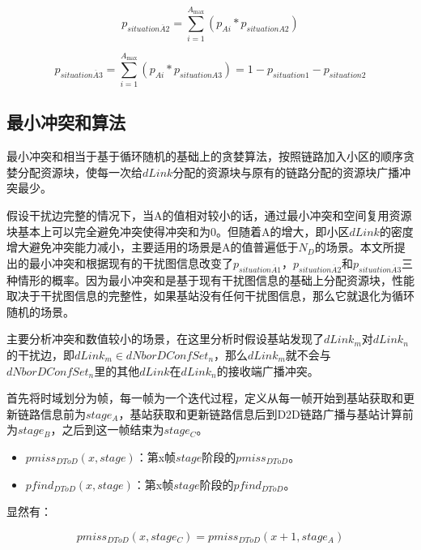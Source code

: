 \documentclass[figurelist,tablelist,algorithmlist,nomlist,masters]{seuthesix}
\begin{document}
	\begin{equation}\label{eq3.1}
	{p_{situation\overline A {2}}} = \sum\limits_{i = 1}^{{A_{\max }}} {({p_{Ai}}*{p_{situationA{2}}})}
	\end{equation}
	
	\begin{equation}\label{eq3.1}
	{p_{situation\overline A 3}} = \sum\limits_{i = 1}^{{A_{\max }}} {({p_{Ai}}*{p_{situationA{3}}}) = } 1 - {p_{situation1}} - {p_{situation{2}}}
	\end{equation}
	
	\subsection{最小冲突和算法}
	最小冲突和相当于基于循环随机的基础上的贪婪算法，按照链路加入小区的顺序贪婪分配资源块，使每一次给$dLink$分配的资源块与原有的链路分配的资源块广播冲突最少。
	
	假设干扰边完整的情况下，当A的值相对较小的话，通过最小冲突和空间复用资源块基本上可以完全避免冲突使得冲突和为0。但随着A的增大，即小区$dLink$的密度增大避免冲突能力减小，主要适用的场景是A的值普遍低于$N_D$的场景。本文所提出的最小冲突和根据现有的干扰图信息改变了${p_{situation\overline A 1}}$，${p_{situation\overline A 2}}$和${p_{situation\overline A 3}}$三种情形的概率。因为最小冲突和是基于现有干扰图信息的基础上分配资源块，性能取决于干扰图信息的完整性，如果基站没有任何干扰图信息，那么它就退化为循环随机的场景。
	
	主要分析冲突和数值较小的场景，在这里分析时假设基站发现了$dLink_m$对$dLink_n$的干扰边，即$dLink_m \in dNborDConfSe{t_n}$，那么$dLink_m$就不会与$dNborDConfSe{t_n}$里的其他$dLink$在$dLink_n$的接收端广播冲突。
	
	首先将时域划分为帧，每一帧为一个迭代过程，定义从每一帧开始到基站获取和更新链路信息前为$stag{e_A}$，基站获取和更新链路信息后到D2D链路广播与基站计算前为$stag{e_B}$，之后到这一帧结束为$stag{e_C}$。
	
	\begin{itemize}
		\item $pmis{s_{DToD}}(x,stage)$：第x帧$stage$阶段的$pmis{s_{DToD}}$。
		\item $pfin{d_{DToD}}(x,stage)$：第x帧$stage$阶段的$pfin{d_{DToD}}$。
	\end{itemize}
	
	显然有：
	
	\begin{equation}\label{eq3.1}
	pmis{s_{DToD}}(x,stag{e_C}) = pmis{s_{DToD}}(x + 1,stag{e_A})
	\end{equation}
	
\end{document}
